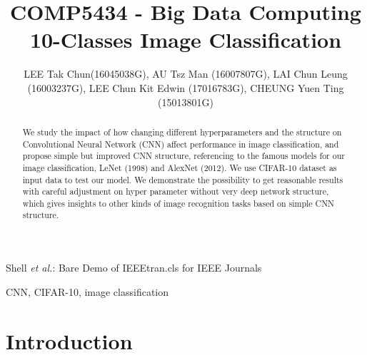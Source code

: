 \documentclass[journal,onecolumn, 12pt]{IEEEtran}
\begin{document}
\title{COMP5434 - Big Data Computing \\
10-Classes Image Classification}

%


\author{ LEE Tak Chun(16045038G), AU Tsz Man (16007807G), 
LAI Chun Leung (16003237G), LEE Chun Kit Edwin (17016783G), 
CHEUNG Yuen Ting (15013801G)
}


%
{Shell \MakeLowercase{\textit{et al.}}: Bare Demo of IEEEtran.cls for IEEE Journals}
%

\maketitle

\begin{abstract}
  We study the impact of how changing different hyperparameters and the structure on Convolutional Neural Network (CNN) affect performance in image classification, and propose simple but improved CNN structure, referencing to the famous models for our image classification, LeNet (1998) and AlexNet (2012). We use CIFAR-10 dataset as input data to test our model. We demonstrate the possibility to get reasonable results with careful adjustment on hyper parameter without very deep network structure, which gives insights to other kinds of image recognition tasks based on simple CNN structure.

\end{abstract}

\begin{IEEEkeywords}
CNN, CIFAR-10, image classification
\end{IEEEkeywords}




\section{Introduction}
\end{document}
